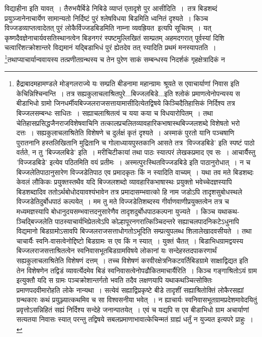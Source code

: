 \documentclass[11pt, openany]{book}
\makeatletter
\newcommand{\devanagarinumeral}[1]{%
	\devanagaridigits{\number \csname c@#1\endcsname}} %
\makeatother
\begin{document}
\afterpage{\fancyhead[RE,LO]{{\small{}}}}
\afterpage{\fancyhead[CE,CO]{[{\small{\thepage}}]}}
\afterpage{\fancyhead[LE,RO]{{\small{}}}}
\cfoot{}

\newpage
\renewcommand{\thepage}{\devanagarinumeral{page}}
\setcounter{page}{2}

\begin{sloppypar}
\noindent विद्याहीना इति यावत्~। तैरुभयैर्बिडे निबिडे व्याप्तं एतादृशे पुर आसीदिति~।~तत्र बिडशब्दं प्रयुञ्जानेनाचार्येण सामान्यतो निर्दिष्टं पुरं श्लेषविधया बिडमिति ध्वनितं दृश्यते~। किञ्च विज्जडव्याप्तत्वादेतत् पुरं लोकैर्विज्जडबिडमिति नाम्ना व्यवह्रियत~इत्यपि सूचितम्~। यत् कृष्णदैवज्ञेनाचार्यवसतिस्थानत्वेन बिडनगरं स्पष्टमुल्लिखितं साम्प्रतम् अहमदगरात् पूर्वस्यां दिशि चत्वारिंशत्क्रोशान्तरे विद्यमानं यद्बिडाभिधं पुरं ह्येतदेव तत् स्यादिति प्रथमं मनस्यापतति~। \renewcommand{\thefootnote}{$\star$}\footnote{हैद्राबादमहामण्डले मोङ्गलराज्ये यः सम्प्रति बीडनामा महान्ग्रामः श्रूयते स एवाचार्याणां निवास इति केचिन्निश्चिन्वन्ति~। तत्र सह्यकुलाचलाश्रितपुरे...बिज्जलबिडे...इति श्लोकं प्रमाणत्वेनोपन्यस्य स बीडाभिधो ग्रामो जिनधर्मीयबिज्जलराजसत्तायामासीदित्येतद्विषये किञ्चिदैतिहासिकं निर्दिश्य तत्र बिज्जलसम्बन्धः साधितः~। सह्याचलाश्रितत्वं च यया कया च विधयारोपितम्~। तथा चेतिहासप्रसिद्धजैनराजविशेषवाचिनि तत्कालप्रचलितव्यावहारिकभाषास्थबिज्जलशब्दे विशेषतो भरो दत्तः~। सह्यकुलाचलाश्रितेति विशेषणे च दुर्लक्षं कृतं दृश्यते~। अस्माकं पुरतो यानि पञ्चषाणि पुरातनानि हस्तलिखितानि मुद्रितानि च गोलाध्यायपुस्तकानि आसते तत्र 'विज्जडबिडे' इति स्पष्टं  पाठो वर्तते, न तु 'बिज्जलबिडे' इति~। मरीचिटीकायां तथा पाठः स्यात्परं लेखकप्रमाद एव सः~। आचार्यैस्तु 'विज्जडबिडे' इत्येव पठितमिति वयं प्रतीमः~। अस्मत्पुरःस्थितविज्जडबिडे इति पाठानुरोधात्~। न च बिज्जलेतिपाठानुसारेण विज्जडेतिपाठ एव प्रमादकृतः किं न स्यादिति वाच्यम्~। यथा तव मते बिडशब्दः केवलं लौकिकः प्रयुक्तस्तथैव यदि बिज्जलशब्दो व्यावहारिकभाषास्थः प्रयुक्तो भवेच्चेदज्ञस्यापि बिडशब्दादिव ततोऽर्थबोधोदयावश्यंभावेन तत्र प्रमादासम्भवात्को हि नाम जडोऽपि तादृशसुबोधस्थले विज्जडेतिदुर्बोधपाठं कल्पयेत्~। मम तु मते विज्जडेतिशब्दस्य गीर्वाणवाणीप्रयुक्तत्वेन तत्र च मध्यमज्ञस्यापि बोधानुदयसम्भवात्तदनुसारेणैव तादृशदुर्बोधपाठकल्पना युज्यते~। किञ्च यथाकथ-ञ्चिद्बिज्जलेति पाठस्याचार्यभिप्रेतत्वेऽपि कोल्हापूरनगरात्किञ्चिदन्तरे सह्याचलपादनिकटेऽधुनापि विद्यमानो बिडग्रामोऽसावपि बिज्जलराजसत्ताधोगतोऽभूदिति सम्प्रत्युपलब्ध शिलालेखादवसीयते~। तथा चाचार्यैः स्वनि-वासत्वेनोद्दिष्टो बिडग्रामः स एव किं न स्यात्~। युक्तं चैतत्~। बिडाभिधग्रामद्वयस्य बिज्जलराजसत्ताश्रितत्वेन स्वनिवासभूतबिडग्रामविषये लोकानां यः सन्देहस्तदपाकरणार्थं सह्यकुलाचलाश्रितेति विशेषणं दत्तम्~। तच्च विशेषणं करवीरक्षेत्रनिकटवर्तिबिडग्रामे साक्षाद्विद्यत इति तेन विशेषणेन तद्विडं व्यावर्त्येदमेव बिडं स्वनिवासत्वेनोपढौकितमाचार्यैरिति~। किञ्च गङ्गाश्रितोऽयं ग्राम इत्युक्तौ यदि स ग्रामः पञ्चक्रोशान्तर्गतो भवति तदैव लक्षणयापि यथाकथञ्चित्सोक्तिः प्रमाणपदवीमारोहति लोके नान्यथा~। सत्येवं सह्याद्विप्रकृष्टे बीडे तादृशीं सह्याश्रितोक्तिं लोकैरसह्यां ग्रन्थकारः कथं प्रयुञ्ज्यात्कथमिव च सा विश्वसनीया भवेत्~। न ह्याचार्यः स्वनिवासभूतग्रामप्रदेशमावेदयितुं प्रवृत्तोऽसन्निहितं सह्यं निर्दिश्य सन्देहे जनान्पातयेत्~। एवं च यद्यपि स एव बीडाभिधो ग्राम अचार्याणां सत्यतया निवासः स्यात् परन्तु तद्विषये सबलप्रमाणाभावात्केचिन्मतं ग्राह्यं धर्तुं न युज्यत इत्यपरे प्राहुः~।}तथाप्याचार्यान्ववायस्य तत्प्रणीतग्रन्थस्य च तेन पुरेण साकं सम्बन्धस्य निदर्शकं गृहक्षेत्रादिकं न 
\end{sloppypar}
\end{document}
